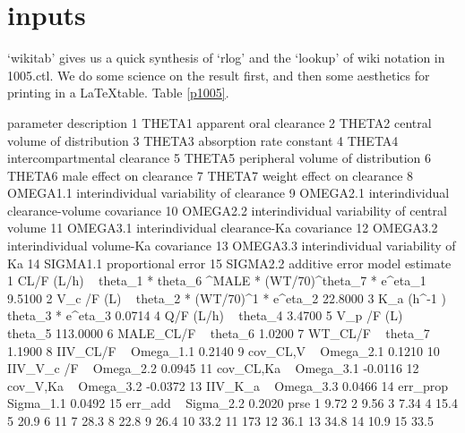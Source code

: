 \section{inputs}
`wikitab' gives us a quick synthesis of `rlog' and the `lookup' of wiki notation in 1005.ctl.
We do some science on the result first, and then some aesthetics for printing in a \LaTeX table.  Table \ref{p1005}.
\begin{Schunk}
\begin{Soutput}
   parameter                                   description
1     THETA1                       apparent oral clearance
2     THETA2                central volume of distribution
3     THETA3                      absorption rate constant
4     THETA4                  intercompartmental clearance
5     THETA5             peripheral volume of distribution
6     THETA6                      male effect on clearance
7     THETA7                    weight effect on clearance
8   OMEGA1.1      interindividual variability of clearance
9   OMEGA2.1   interindividual clearance-volume covariance
10  OMEGA2.2 interindividual variability of central volume
11  OMEGA3.1       interindividual clearance-Ka covariance
12  OMEGA3.2          interindividual volume-Ka covariance
13  OMEGA3.3             interindividual variability of Ka
14  SIGMA1.1                            proportional error
15  SIGMA2.2                                additive error
                                                                model estimate
1  CL/F (L/h) ~ theta_1 *  theta_6 ^MALE * (WT/70)^theta_7  * e^eta_1   9.5100
2                          V_c /F (L) ~ theta_2 * (WT/70)^1 * e^eta_2  22.8000
3                                     K_a (h^-1 ) ~ theta_3 * e^eta_3   0.0714
4                                                 Q/F (L/h) ~ theta_4   3.4700
5                                                V_p /F (L) ~ theta_5 113.0000
6                                                 MALE_CL/F ~ theta_6   1.0200
7                                                   WT_CL/F ~ theta_7   1.1900
8                                                IIV_CL/F ~ Omega_1.1   0.2140
9                                                cov_CL,V ~ Omega_2.1   0.1210
10                                             IIV_V_c /F ~ Omega_2.2   0.0945
11                                             cov_CL,Ka  ~ Omega_3.1  -0.0116
12                                              cov_V,Ka  ~ Omega_3.2  -0.0372
13                                               IIV_K_a  ~ Omega_3.3   0.0466
14                                               err_prop ~ Sigma_1.1   0.0492
15                                                err_add ~ Sigma_2.2   0.2020
   prse
1  9.72
2  9.56
3  7.34
4  15.4
5  20.9
6    11
7  28.3
8  22.8
9  26.4
10 33.2
11  173
12 36.1
13 34.8
14 10.9
15 33.5
\end{Soutput}
\end{Schunk}
